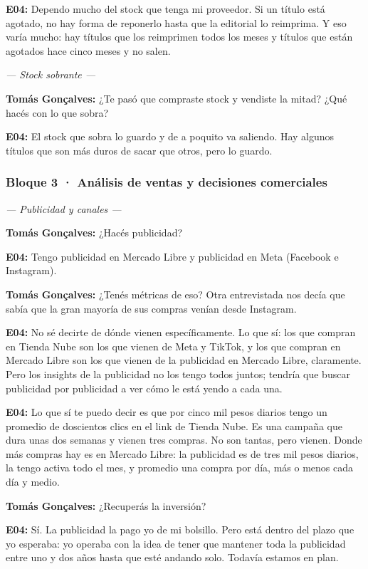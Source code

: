 \noindent\textbf{E04:} Dependo mucho del stock que tenga mi proveedor. Si un título está agotado, no hay forma de reponerlo hasta que la editorial lo reimprima. Y eso varía mucho: hay títulos que los reimprimen todos los meses y títulos que están agotados hace cinco meses y no salen.

\noindent\textit{--- Stock sobrante ---}

\noindent\textbf{Tomás Gonçalves:} ¿Te pasó que compraste stock y vendiste la mitad? ¿Qué hacés con lo que sobra?

\noindent\textbf{E04:} El stock que sobra lo guardo y de a poquito va saliendo. Hay algunos títulos que son más duros de sacar que otros, pero lo guardo.

\subsubsection*{Bloque 3 · Análisis de ventas y decisiones comerciales}

\noindent\textit{--- Publicidad y canales ---}

\noindent\textbf{Tomás Gonçalves:} ¿Hacés publicidad?

\noindent\textbf{E04:} Tengo publicidad en Mercado Libre y publicidad en Meta (Facebook e Instagram).

\noindent\textbf{Tomás Gonçalves:} ¿Tenés métricas de eso? Otra entrevistada nos decía que sabía que la gran mayoría de sus compras venían desde Instagram.

\noindent\textbf{E04:} No sé decirte de dónde vienen específicamente. Lo que sí: los que compran en Tienda Nube son los que vienen de Meta y TikTok, y los que compran en Mercado Libre son los que vienen de la publicidad en Mercado Libre, claramente. Pero los insights de la publicidad no los tengo todos juntos; tendría que buscar publicidad por publicidad a ver cómo le está yendo a cada una.

\noindent\textbf{E04:} Lo que sí te puedo decir es que por cinco mil pesos diarios tengo un promedio de doscientos clics en el link de Tienda Nube. Es una campaña que dura unas dos semanas y vienen tres compras. No son tantas, pero vienen. Donde más compras hay es en Mercado Libre: la publicidad es de tres mil pesos diarios, la tengo activa todo el mes, y promedio una compra por día, más o menos cada día y medio.

\noindent\textbf{Tomás Gonçalves:} ¿Recuperás la inversión?

\noindent\textbf{E04:} Sí. La publicidad la pago yo de mi bolsillo. Pero está dentro del plazo que yo esperaba: yo operaba con la idea de tener que mantener toda la publicidad entre uno y dos años hasta que esté andando solo. Todavía estamos en plan.

